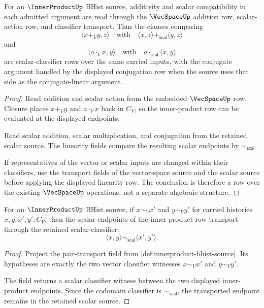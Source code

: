 \begin{theorem}
\label{thm:innerproduct-vecspace-linearity-row}
For an $\InnerProductUp$ BHist source, additivity and scalar compatibility in
each admitted argument are read through the $\VecSpaceUp$ addition row,
scalar-action row, and classifier transport. Thus the clauses comparing
$$
\langle x+_V y,z\rangle
\quad\text{with}\quad
\langle x,z\rangle+_{\mathsf{scal}}\langle y,z\rangle
$$
and
$$
\langle a\cdot_V x,y\rangle
\quad\text{with}\quad
a\cdot_{\mathsf{scal}}\langle x,y\rangle
$$
are scalar-classifier rows over the same carried inputs, with the conjugate
argument handled by the displayed conjugation row when the source uses that
side as the conjugate-linear argument.
\end{theorem}
\begin{proof}
Read addition and scalar action from the embedded $\VecSpaceUp$ row. Closure
places $x+_V y$ and $a\cdot_V x$ back in $C_V$, so the inner-product row can
be evaluated at the displayed endpoints.

Read scalar addition, scalar multiplication, and conjugation from the retained
scalar source. The linearity fields compare the resulting scalar endpoints by
$\sim_{\mathsf{scal}}$.

If representatives of the vector or scalar inputs are changed within their
classifiers, use the transport fields of the vector-space source and the
scalar source before applying the displayed linearity row. The conclusion is
therefore a row over the existing $\VecSpaceUp$ operations, not a separate
algebraic structure.
\end{proof}

\begin{theorem}
\label{thm:innerproduct-classifier-transport-row}
For an $\InnerProductUp$ BHist source, if $x\sim_Vx'$ and $y\sim_Vy'$ for
carried histories $x,y,x',y':C_V$, then the scalar endpoints of the
inner-product row transport through the retained scalar classifier:
$$
\langle x,y\rangle
\sim_{\mathsf{scal}}
\langle x',y'\rangle.
$$
\end{theorem}
\begin{proof}
Project the pair-transport field from
\autoref{def:innerproduct-bhist-source}. Its hypotheses are exactly the two
vector classifier witnesses $x\sim_Vx'$ and $y\sim_Vy'$.

The field returns a scalar classifier witness between the two displayed
inner-product endpoints. Since the codomain classifier is
$\sim_{\mathsf{scal}}$, the transported endpoint remains in the retained
scalar source.
\end{proof}

